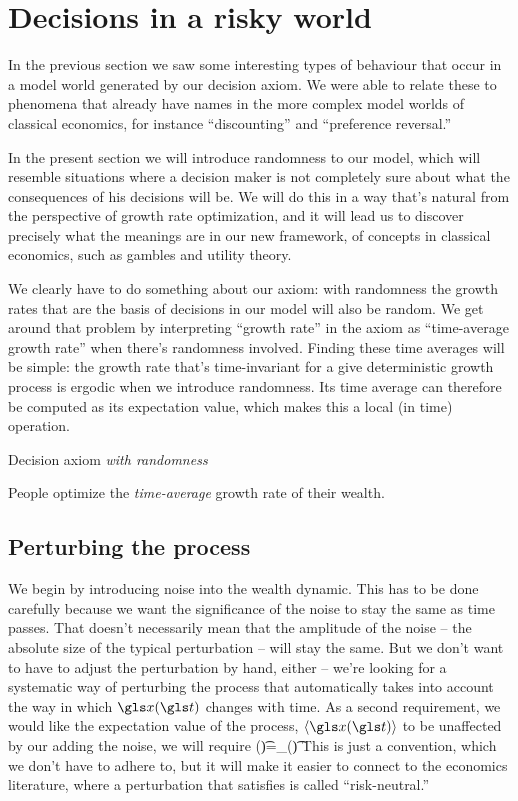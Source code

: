 \chapter{Decisions in a risky world}
In the previous section we saw some interesting types of behaviour that occur in a model world generated by our decision axiom. We were able to relate these to phenomena that already have names in the more complex model worlds of classical economics, for instance ``discounting'' and ``preference reversal.''

In the present section we will introduce randomness to our model, which will resemble situations where a decision maker is not completely sure about what the consequences of his decisions will be. We will do this in a way that's natural from the perspective of growth rate optimization, and it will lead us to discover precisely what the meanings are in our new framework, of concepts in classical economics, such as gambles and utility theory.

We clearly have to do something about our axiom: with randomness the growth rates that are the basis of decisions in our model will also be random. We get around that problem by interpreting ``growth rate'' in the axiom as ``time-average growth rate'' when there's randomness involved. Finding these time averages will be simple: the growth rate that's time-invariant for a give deterministic growth process is ergodic when we introduce randomness. Its time average can therefore be computed as its expectation value, which makes this a local (in time) operation.

\begin{keypts}{Decision axiom {\it with randomness}}

People optimize the {\it time-average} growth rate of their wealth.

\end{keypts}

\section{Perturbing the process}
We begin by introducing noise into the wealth dynamic. This has to be done carefully because we want the significance of the noise to stay the same as time passes. That doesn't necessarily mean that the amplitude of the noise -- the absolute size of the typical perturbation -- will stay the same. But we don't want to have to adjust the perturbation by hand, either -- we're looking for a systematic way of perturbing the process that automatically takes into account the way in which $\x(\t)$ changes with time. As a second requirement, we would like the expectation value of the process, $\ave{\x(\t)}$ to be unaffected by our adding the noise, \ie we will require
\be
{}(\t)=\x_{}(\t)
\ee
This is just a convention, which we don't have to adhere to, but it will make it easier to connect to the economics literature, where a perturbation that satisfies  is called ``risk-neutral.''

